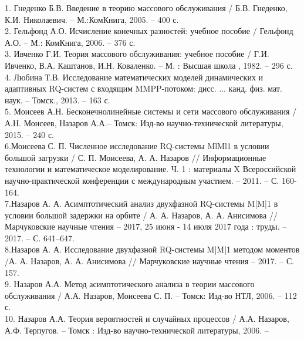 1. Гнеденко Б.В.  Введение в теорию массового обслуживания / Б.В. Гнеденко, К.И. Николаевич. – М.:КомКнига, 2005. – 400 с.\\
\hspace*{\parindent}%
2. Гельфонд А.О. Исчисление конечных разностей: учебное пособие / Гельфонд А.О. -- М.: КомКнига, 2006. -- 376 с.\\
\hspace*{\parindent}
3. Ивченко Г.И. Теория массового обслуживания: учебное пособие / Г.И. Ивченко, В.А. Каштанов, И.Н. Коваленко. -- 	
М. : Высшая школа , 1982. -- 296 с.\\
\hspace*{\parindent}
4. Любина Т.В. Исследование математических моделей динамических и адаптивных RQ-систем с входящим MMPP-потоком: дисс. ... канд. физ. мат. наук. -- Томск., 2013. -- 163 с.\\
\hspace*{\parindent}
5. Моисеев А.Н. Бесконечнолинейные системы и сети массового обслуживания / А.Н. Моисеев, Назаров А.А.-- Томск: Изд-во научно-технической литературы, 2015. -- 240 с.\\
\hspace*{\parindent}
6.Моисеева С. П. Численное исследование RQ-системы MlMl1 в условии большой загрузки / С. П. Моисеева, А. А. Назаров // Информационные технологии и математическое моделирование. Ч. 1 : материалы X Всероссийской научно-практической конференции с международным участием. -- 2011. -- С. 160-164. \\
\hspace*{\parindent}
7.Назаров А. А. Асимптотический анализ двухфазной RQ-системы M|M|1 в условии большой задержки на орбите / А. А. Назаров, А. А. Анисимова // Марчуковские научные чтения – 2017, 25 июня - 14 июля 2017 года : труды. -- 2017. -- С. 641--647.\\
\hspace*{\parindent}
8.Назаров А. А. Исследование двухфазной RQ-системы M|M|1 методом моментов  /А. А. Назаров, А. А. Анисимова // Марчуковские научные чтения -- 2017. -- С. 157.\\
\hspace*{\parindent}
9.  Назаров А.А. Метод асимптотического анализа в теории массового обслуживания / А.А. Назаров, Моисеева С. П. -- Томск: Изд-во НТЛ, 2006. -- 112 с.\\
\hspace*{\parindent}
10. Назаров А.А. Теория вероятностей и случайных процессов / А.А. Назаров,
А.Ф. Терпугов. -- Томск : Изд-во научно-технической литературы, 2006. --
